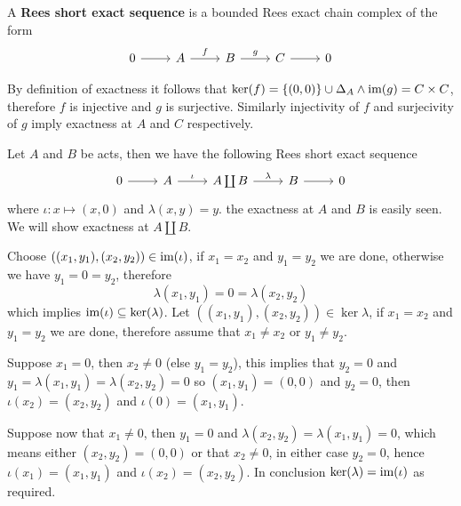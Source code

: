 \begin{definition}
    A \textbf{Rees short exact sequence} is a bounded Rees exact chain complex of the form
    \[\begin{tikzcd}
        0 & A & B & C & 0
        \arrow[from=1-1, to=1-2]
        \arrow["f", from=1-2, to=1-3]
        \arrow["g", from=1-3, to=1-4]
        \arrow[from=1-4, to=1-5]
    \end{tikzcd}\]
\end{definition}
\begin{remark}
    By definition of exactness it follows that $\mathrm{ker}(f) = \{(0,0)\}\cup\Delta_A \land \text{im}(g)= C\times C$, therefore 
    $f$ is injective and $g$ is surjective. Similarly injectivity of $f$ and surjecivity of $g$ imply exactness at $A$ 
    and $C$ respectively.
\end{remark}
\begin{example}
    Let $A$ and $B$ be acts, then we have the following Rees short exact sequence
    \[\begin{tikzcd}
        0 & A & {A\coprod B} & B & 0
        \arrow[from=1-1, to=1-2]
        \arrow["\iota", from=1-2, to=1-3]
        \arrow["\lambda", from=1-3, to=1-4]
        \arrow[from=1-4, to=1-5]
    \end{tikzcd}\]
    where $\iota: x \mapsto (x,0)$ and $\lambda(x,y) = y$.
    the exactness at $A$ and $B$ is easily seen. We will show exactness 
    at $A\coprod B$.\par
    Choose $((x_1,y_1),(x_2,y_2))\in\text{im}(\iota)$, if $x_1=x_2$ and $y_1=y_2$ we are done, 
    otherwise we have $y_1=0=y_2$, therefore 
    \[
        \lambda(x_1,y_1)=0=\lambda(x_2,y_2)
    \]
    which implies $\text{im}(\iota)\subseteq\mathrm{ker}(\lambda)$.
    Let $((x_1,y_1),(x_2,y_2))\in\ker{\lambda}$, if $x_1=x_2$ and $y_1=y_2$
    we are done, therefore assume that $x_1\neq x_2$ or $y_1\neq y_2$.\par
    Suppose $x_1=0$, then $x_2\neq 0$ (else $y_1=y_2$), this implies
    that $y_2=0$ and $y_1=\lambda(x_1,y_1)=\lambda(x_2,y_2)=0$
    so $(x_1,y_1)=(0,0)$ and $y_2=0$, then 
    $\iota(x_2)=(x_2,y_2)$ and $\iota(0)=(x_1,y_1)$.\par
    Suppose now that $x_1\neq 0$, then $y_1=0$ and 
    $\lambda(x_2,y_2)=\lambda(x_1,y_1)=0$, which means either 
    $(x_2,y_2)=(0,0)$ or that $x_2\neq 0$, in either case $y_2=0$,
    hence $\iota(x_1)=(x_1,y_1)$ and $\iota(x_2)=(x_2,y_2)$.
    In conclusion $\mathrm{ker}(\lambda)=\text{im}(\iota)$ as required.
\end{example}
